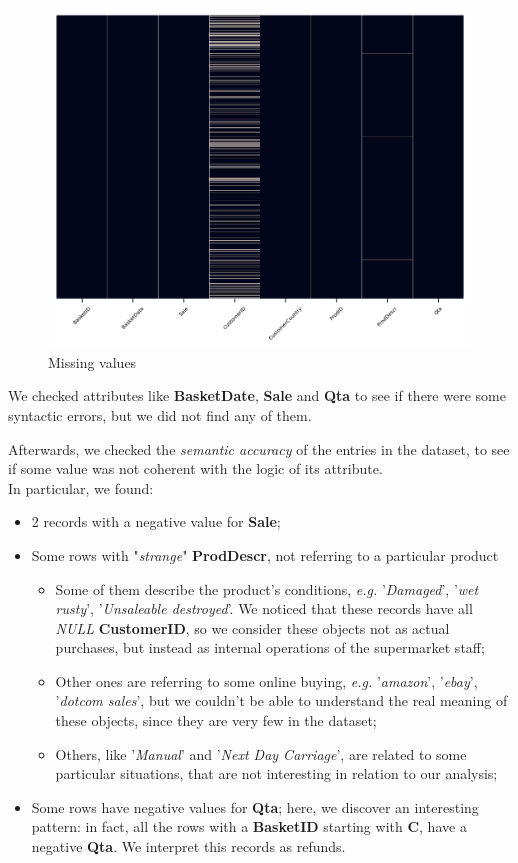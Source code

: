 \begin{figure}[h!]
\centering
\includegraphics[height=9cm, width=15cm]{img/missing_values.png}
\caption{Missing values}
\end{figure}

We checked attributes like \textbf{BasketDate}, \textbf{Sale} and \textbf{Qta} to see if there were some syntactic errors, but we did not find any of them.

Afterwards, we checked the \emph{semantic accuracy} of the entries in the dataset, to see if some value was not coherent with the logic of its attribute.\\
In particular, we found:
\begin{itemize}
\item 2 records with a negative value for \textbf{Sale};

\item Some rows with "\emph{strange}" \textbf{ProdDescr}, not referring to a particular product
	\begin{itemize}
		\item Some of them describe the product's conditions, \emph{e.g.} '\emph{Damaged}', '\emph{wet rusty}', '\emph{Unsaleable destroyed}'. We noticed that these records have all \emph{NULL} \textbf{CustomerID}, so we consider these objects not as actual purchases, but instead as internal operations of the supermarket staff;
		\item Other ones are referring to some online buying, \emph{e.g.} '\emph{amazon}', '\emph{ebay}', '\emph{dotcom sales}', but we couldn't be able to understand the real meaning of these objects, since they are very few in the dataset;
		\item Others, like '\emph{Manual}' and '\emph{Next Day Carriage}', are related to some particular situations, that are not interesting in relation to our analysis;
	\end{itemize}

\item Some rows have negative values for \textbf{Qta}; here, we discover an interesting pattern: in fact, all the rows with a \textbf{BasketID} starting with \textbf{C}, have a negative \textbf{Qta}. We interpret this records as refunds.
\end{itemize}

